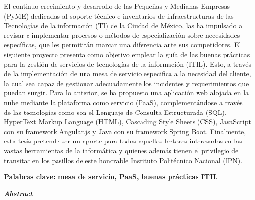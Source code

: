 


\begin{abstracts}        %

El continuo crecimiento y desarrollo de las Pequeñas y Medianas Empresas (PyME) dedicadas al soporte técnico e inventarios de infraestructuras de las Tecnologías de la información (TI) de la  Ciudad de México, las ha impulsado a revisar e implementar procesos o métodos de especialización sobre necesidades específicas, que les permitirán marcar una diferencia ante sus competidores.
\newline
El siguiente proyecto presenta como objetivo emplear la guía de las buenas prácticas para la gestión de servicios de tecnologías de la información (ITIL). Esto, a través de la implementación de una mesa de servicio especifica a la necesidad del cliente, la cual sea capaz de gestionar adecuadamente los incidentes y requerimientos que puedan surgir. 
\newline
Para lo anterior, se ha propuesto una aplicación web alojada en la nube mediante la plataforma como servicio (PaaS), complementándose a través de las tecnologías como son el Lenguaje de Consulta Estructurada (SQL), HyperText Markup Language (HTML), Cascading Style Sheets (CSS), JavaScript con su framework Angular.js y Java con su framework Spring Boot. 
\newline
Finalmente, esta tesis pretende ser un aporte para todos aquellos lectores interesados en las vastas herramientas de la informática y quienes además tienen el privilegio de transitar en los pasillos de este honorable Instituto Politécnico Nacional (IPN). 

\begin{center}
	\textbf{Palabras clave: mesa de servicio, PaaS, buenas prácticas ITIL}
\end{center}

\begin{flushright}
	\textbf{\textit{Abstract}}
\end{flushright}


\end{abstracts}
